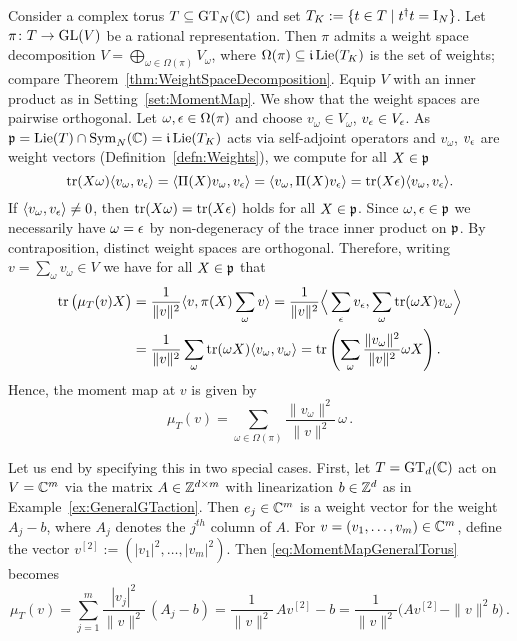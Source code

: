 \begin{example} \label{ex:MomentMapTorus}
	Consider a complex torus $T \subseteq \operatorname{GT}_N(\mathbb C)$ and set $T_K := \{ t \in T \mid t^{\dagger} t = \operatorname{I}_N\}$. Let $\pi \colon T \to \operatorname{GL}(V)$ be a rational representation. Then $\pi$ admits a weight space decomposition $V = \bigoplus_{\omega \in \Omega(\pi)} V_\omega$, where $\Omega(\pi) \subseteq \mathfrak{i} \operatorname{Lie}(T_K)$ is the set of weights; compare Theorem~\ref{thm:WeightSpaceDecomposition}. Equip $V$ with an inner product as in Setting~\ref{set:MomentMap}. We show that the weight spaces are pairwise orthogonal. Let $\omega, \epsilon \in \Omega(\pi)$ and choose $v_\omega \in V_\omega$, $v_\epsilon \in V_{\epsilon}$. As $\mathfrak{p} = \operatorname{Lie}(T) \cap \operatorname{Sym}_N(\mathbb C) = \mathfrak{i} \operatorname{Lie}(T_K)$ acts via self-adjoint operators and $v_\omega$, $v_\epsilon$ are weight vectors (Definition~\ref{defn:Weights}), we compute for all $X \in \mathfrak{p}$
		\[ \operatorname{tr}(X\omega) \langle v_\omega, v_\epsilon \rangle = \langle \Pi(X)v_\omega, v_\epsilon \rangle 
		= \langle v_\omega, \Pi(X) v_\epsilon \rangle = \operatorname{tr}(X\epsilon) \langle v_\omega, v_\epsilon \rangle .\]
	If $\langle v_\omega, v_\epsilon \rangle \neq 0$, then $\operatorname{tr}(X\omega) = \operatorname{tr}(X\epsilon)$ holds for all $X \in \mathfrak{p}$. Since $\omega, \epsilon \in \mathfrak{p}$ we necessarily have $\omega = \epsilon$ by non-degeneracy of the trace inner product on $\mathfrak{p}$. By contraposition, distinct weight spaces are orthogonal. Therefore, writing $v = \sum_\omega v_\omega \in V$ we have for all $X \in \mathfrak{p}$ that
		\begin{align*}
			\operatorname{tr} \big( \mu_T(v) X \big) &= \frac{1}{\|v\|^2} \langle v, \pi(X) \sum_{\omega} v \rangle
			= \frac{1}{\|v\|^2} \Big\langle \sum_\epsilon v_\epsilon, \sum_{\omega} \operatorname{tr}(\omega X) v_\omega \Big\rangle \\
			&= \frac{1}{\|v\|^2} \sum_{\omega} \operatorname{tr}(\omega X) \langle v_\omega, v_\omega \rangle
			= \operatorname{tr} \left( \sum_{\omega} \frac{\|v_\omega\|^2}{\|v\|^2} \omega X \right) .
		\end{align*}
	Hence, the moment map at $v$ is given by
		\begin{equation}\label{eq:MomentMapGeneralTorus}
			\mu_T(v) = \sum_{\omega \in \Omega(\pi)}  \frac{\|v_\omega\|^2}{\|v\|^2} \, \omega \, .
		\end{equation}
	
	Let us end by specifying this in two special cases. First, let $T = \operatorname{GT}_d(\mathbb C)$ act on $V = \mathbb C^m$ via the matrix $A \in \mathbb Z^{d \times m}$ with linearization $b \in \mathbb Z^d$ as in Example~\ref{ex:GeneralGTaction}. Then $e_j \in \mathbb C^m$ is a weight vector for the weight $A_j - b$, where $A_j$ denotes the $j^{th}$ column of $A$.  For $v = (v_1,\ldots,v_m) \in \mathbb C^m$, define the vector $v^{[2]} := (|v_1|^2, \ldots, |v_m|^2)$. %
	Then \eqref{eq:MomentMapGeneralTorus} becomes
		\begin{equation}\label{eq:MomentMapTorusA-b}
			\mu_T(v) = \sum_{j=1}^m \frac{|v_j|^2}{\|v\|^2} \, (A_j - b) = \frac{1}{\|v\|^2} \, Av^{[2]} - b
			= \frac{1}{\|v\|^2} \big( Av^{[2]} - \|v\|^2 b \big) \, .
		\end{equation}
	

\end{example}
